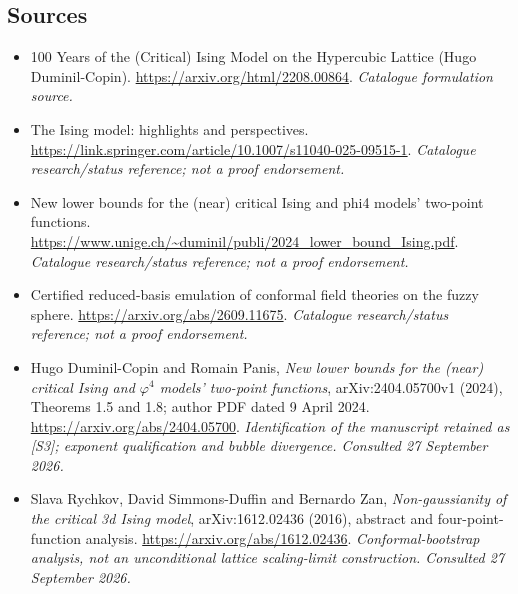 \documentclass[11pt,a4paper]{article}
\numberwithin{equation}{section}
\begin{document}
\subsection{Sources}
\begin{itemize}\raggedright
\item[\textnormal{[S1]}]\hypertarget{source:statement:1}{} 100 Years of the (Critical) Ising Model on the Hypercubic Lattice (Hugo Duminil-Copin).
\url{https://arxiv.org/html/2208.00864}.
{\small\textit{Catalogue formulation source.}}
\item[\textnormal{[S2]}]\hypertarget{source:statement:2}{} The Ising model: highlights and perspectives.
\url{https://link.springer.com/article/10.1007/s11040-025-09515-1}.
{\small\textit{Catalogue research/status reference; not a proof endorsement.}}
\item[\textnormal{[S3]}]\hypertarget{source:statement:3}{} New lower bounds for the (near) critical Ising and phi4 models' two-point functions.
\url{https://www.unige.ch/~duminil/publi/2024_lower_bound_Ising.pdf}.
{\small\textit{Catalogue research/status reference; not a proof endorsement.}}
\item[\textnormal{[S4]}]\hypertarget{source:statement:4}{} Certified reduced-basis emulation of conformal field theories on the fuzzy sphere.
\url{https://arxiv.org/abs/2609.11675}.
{\small\textit{Catalogue research/status reference; not a proof endorsement.}}
\item[\textnormal{[E1]}]\hypertarget{extra:statement:1}{} Hugo Duminil-Copin and Romain Panis,
\emph{New lower bounds for the (near) critical Ising and $\varphi^4$ models' two-point functions},
arXiv:2404.05700v1 (2024), Theorems 1.5 and 1.8; author PDF dated 9 April 2024.
\url{https://arxiv.org/abs/2404.05700}.
{\small\textit{Identification of the manuscript retained as [S3]; exponent qualification and bubble divergence. Consulted 27 September 2026.}}
\item[\textnormal{[E2]}]\hypertarget{extra:statement:2}{} Slava Rychkov, David Simmons-Duffin and Bernardo Zan,
\emph{Non-gaussianity of the critical 3d Ising model}, arXiv:1612.02436 (2016), abstract and four-point-function analysis.
\url{https://arxiv.org/abs/1612.02436}.
{\small\textit{Conformal-bootstrap analysis, not an unconditional lattice scaling-limit construction. Consulted 27 September 2026.}}
\end{itemize}
\end{document}
